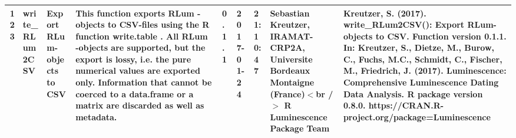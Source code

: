 \begin{table}[ht]
\begin{tabular}{rllllllll}
 \\ 
  123 & write\_RLum2CSV & Export RLum-objects to CSV & This function exports  RLum -objects to CSV-files using the R function write.table . All  RLum -objects are supported, but the export is lossy, i.e. the pure numerical values are exported only. Information that cannot be coerced to a  data.frame  or a  matrix  are discarded as well as metadata. & 0.1.1 & 2017-01-24 & 21:10:47
 & Sebastian Kreutzer, IRAMAT-CRP2A, Universite Bordeaux Montaigne (France)$<$br /$>$  R Luminescence Package Team & Kreutzer, S. (2017). write\_RLum2CSV(): Export RLum-objects to CSV. Function version 0.1.1. In: Kreutzer, S., Dietze, M., Burow, C., Fuchs, M.C., Schmidt, C., Fischer, M., Friedrich, J. (2017). Luminescence: Comprehensive Luminescence Dating Data Analysis. R package version 0.8.0. https://CRAN.R-project.org/package=Luminescence
 \\ 
   \hline
\end{tabular}
\end{table}

